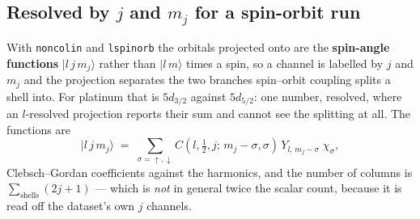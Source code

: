 \documentclass[11pt,a4paper]{article}
\newcommand{\code}[1]{\texttt{\small #1}}
\begin{document}
\subsection*{Resolved by $j$ and $m_j$ for a spin-orbit run}

With \code{noncolin} and \code{lspinorb} the orbitals projected onto are the
\textbf{spin-angle functions} $|l\,j\,m_j\rangle$ rather than $|l\,m\rangle$
times a spin, so a channel is labelled by $j$ and $m_j$ and the projection
separates the two branches spin--orbit coupling splits a shell into. For
platinum that is $5d_{3/2}$ against $5d_{5/2}$: one number, resolved, where an
$l$-resolved projection reports their sum and cannot see the splitting at all.
The functions are
\begin{equation*}
  |l\,j\,m_j\rangle \;=\;
  \sum_{\sigma=\uparrow,\downarrow}
  C\!\left(l,\tfrac12,j;\,m_j-\sigma,\sigma\right)\,
  Y_{l,\,m_j-\sigma}\;\chi_\sigma ,
\end{equation*}
Clebsch--Gordan coefficients against the harmonics, and the number of columns is
$\sum_\mathrm{shells}(2j+1)$ --- which is \emph{not} in general twice the scalar
count, because it is read off the dataset's own $j$ channels.

\end{document}
